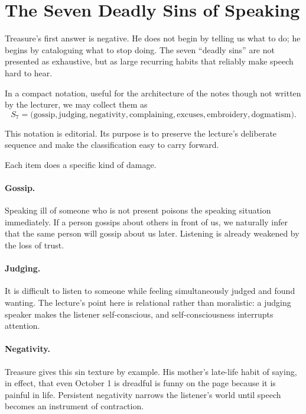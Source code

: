 \section{The Seven Deadly Sins of Speaking}

Treasure's first answer is negative. He does not begin by telling us what to do; he begins by cataloguing what to stop doing. The seven ``deadly sins'' are not presented as exhaustive, but as large recurring habits that reliably make speech hard to hear.

In a compact notation, useful for the architecture of the notes though not written by the lecturer, we may collect them as
\begin{equation}
S_7 =
\bigl(
\text{gossip},
\text{judging},
\text{negativity},
\text{complaining},
\text{excuses},
\text{embroidery},
\text{dogmatism}
\bigr).
\end{equation}

\begin{remark}
This notation is editorial. Its purpose is to preserve the lecture's deliberate sequence and make the classification easy to carry forward.
\end{remark}

Each item does a specific kind of damage.

\paragraph{Gossip.} Speaking ill of someone who is not present poisons the speaking situation immediately. If a person gossips about others in front of us, we naturally infer that the same person will gossip about us later. Listening is already weakened by the loss of trust.

\paragraph{Judging.} It is difficult to listen to someone while feeling simultaneously judged and found wanting. The lecture's point here is relational rather than moralistic: a judging speaker makes the listener self-conscious, and self-consciousness interrupts attention.

\paragraph{Negativity.} Treasure gives this sin texture by example. His mother's late-life habit of saying, in effect, that even October 1 is dreadful is funny on the page because it is painful in life. Persistent negativity narrows the listener's world until speech becomes an instrument of contraction.

